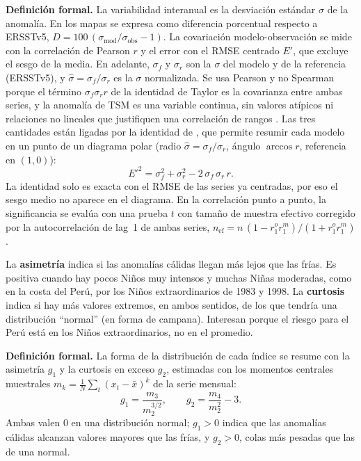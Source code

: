 \documentclass[11pt,a4paper]{article}
\begin{document}
\noindent\textbf{Definición formal.} La variabilidad interanual es la desviación estándar $\sigma$ de la anomalía. En los mapas se expresa como diferencia porcentual respecto a ERSSTv5, $D = 100\,(\sigma_{\mathrm{mod}}/\sigma_{\mathrm{obs}} - 1)$. La covariación modelo-observación se mide con la correlación de Pearson $r$ y el error con el RMSE centrado $E'$, que excluye el sesgo de la media. En adelante, $\sigma_f$ y $\sigma_r$ son la $\sigma$ del modelo y de la referencia (ERSSTv5), y $\hat\sigma=\sigma_f/\sigma_r$ es la $\sigma$ normalizada. Se usa Pearson y no Spearman porque el término $\sigma_f\sigma_r r$ de la identidad de Taylor es la covarianza entre ambas series, y la anomalía de TSM es una variable continua, sin valores atípicos ni relaciones no lineales que justifiquen una correlación de rangos \citep{wilks2011}. Las tres cantidades están ligadas por la identidad de \citet{taylor2001}, que permite resumir cada modelo en un punto de un diagrama polar (radio $\hat\sigma = \sigma_f/\sigma_r$, ángulo $\arccos r$, referencia en $(1,0)$):
\begin{equation}
\label{eq:taylor}
E'^2 = \sigma_f^2 + \sigma_r^2 - 2\,\sigma_f\,\sigma_r\,r .
\end{equation}
La identidad solo es exacta con el RMSE de las series ya centradas, por eso el sesgo medio no aparece en el diagrama. En la correlación punto a punto, la significancia se evalúa con una prueba $t$ con tamaño de muestra efectivo corregido por la autocorrelación de lag~1 de ambas series, $n_{\mathrm{ef}} = n\,(1-r_1^{o} r_1^{m})/(1+r_1^{o} r_1^{m})$ \citep{bretherton1999}.

\begin{basico}
La \textbf{asimetría} indica si las anomalías cálidas llegan más lejos que las frías. Es positiva cuando hay pocos Niños muy intensos y muchas Niñas moderadas, como en la costa del Perú, por los Niños extraordinarios de 1983 y 1998. La \textbf{curtosis} indica si hay más valores extremos, en ambos sentidos, de los que tendría una distribución ``normal'' (en forma de campana). Interesan porque el riesgo para el Perú está en los Niños extraordinarios, no en el promedio.
\end{basico}

\noindent\textbf{Definición formal.} La forma de la distribución de cada índice se resume con la asimetría $g_1$ y la curtosis en exceso $g_2$, estimadas con los momentos centrales muestrales $m_k = \tfrac{1}{N}\sum_t (x_t - \bar x)^k$ de la serie mensual:
\[
g_1 = \frac{m_3}{m_2^{3/2}}, \qquad g_2 = \frac{m_4}{m_2^{2}} - 3 .
\]
Ambas valen 0 en una distribución normal; $g_1 > 0$ indica que las anomalías cálidas alcanzan valores mayores que las frías, y $g_2 > 0$, colas más pesadas que las de una normal.
\end{document}
